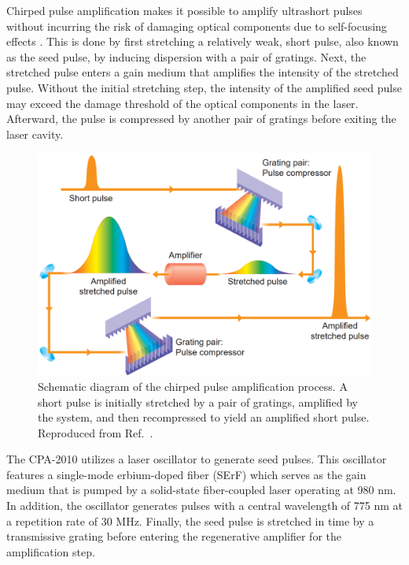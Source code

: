 Chirped pulse amplification makes it possible to amplify ultrashort pulses without incurring the risk of damaging optical components due to self-focusing effects \cite{strickland1985compression}. This is done by first stretching a relatively weak, short pulse, also known as the seed pulse, by inducing dispersion with a pair of gratings. Next, the stretched pulse enters a gain medium that amplifies the intensity of the stretched pulse. Without the initial stretching step, the intensity of the amplified seed pulse may exceed the damage threshold of the optical components in the laser. Afterward, the pulse is compressed by another pair of gratings before exiting the laser cavity.

\begin{figure}
	\centering
	\includegraphics[scale=0.35]{images/chapter_methods/cpa_process_service}
	\caption{Schematic diagram of the chirped pulse amplification process. A short pulse is initially stretched by a pair of gratings, amplified by the system, and then recompressed to yield an amplified short pulse. Reproduced from Ref.\ \cite{service154}.}
	\label{fig:cpa_process}
\end{figure}

The CPA-2010 utilizes a laser oscillator to generate seed pulses. This oscillator features a single-mode erbium-doped fiber (SErF) which serves as the gain medium that is pumped by a solid-state fiber-coupled laser operating at 980 nm. In addition, the oscillator generates pulses with a central wavelength of 775 nm at a repetition rate of 30 MHz. Finally, the seed pulse is stretched in time by a transmissive grating before entering the regenerative amplifier for the amplification step.

